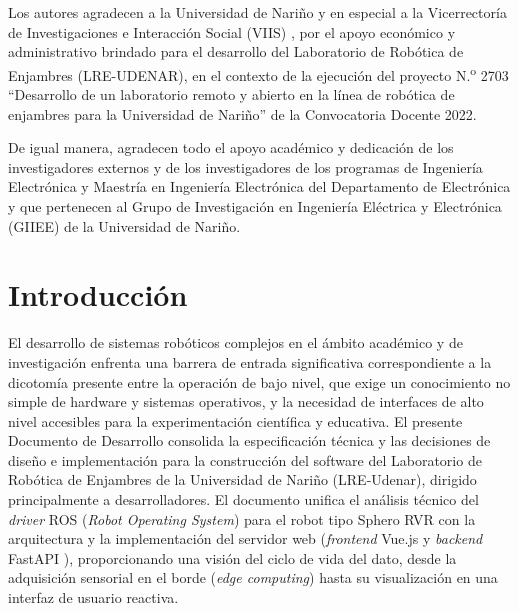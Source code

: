 \documentclass[12pt]{article}
\numberwithin{figure}{section}
\numberwithin{table}{section}
\begin{document}
Los autores agradecen a la Universidad de Nariño y en especial a la Vicerrectoría de Investigaciones e Interacción Social (VIIS) \cite{Udenar_VIIS_Web}, por el apoyo económico y administrativo brindado para el desarrollo del Laboratorio de Robótica de Enjambres (LRE-UDENAR), en el contexto de la ejecución del proyecto N.\textsuperscript{o} 2703 ``Desarrollo de un laboratorio remoto y abierto en la línea de robótica de enjambres para la Universidad de Nariño'' de la Convocatoria Docente 2022.

De igual manera, agradecen todo el apoyo académico y dedicación de los investigadores externos y de los investigadores de los programas de Ingeniería Electrónica y Maestría en Ingeniería Electrónica del Departamento de Electrónica y que pertenecen al Grupo de Investigación en Ingeniería Eléctrica y Electrónica (GIIEE) de la Universidad de Nariño.


\section{Introducción}
\justifying

El desarrollo de sistemas robóticos complejos en el ámbito académico y de investigación enfrenta una barrera de entrada significativa correspondiente a la dicotomía presente entre la operación de bajo nivel, que exige un conocimiento no simple de hardware y sistemas operativos, y la necesidad de interfaces de alto nivel accesibles para la experimentación científica y educativa. El presente Documento de Desarrollo consolida la especificación técnica y las decisiones de diseño e implementación para la construcción del software del Laboratorio de Robótica de Enjambres de la Universidad de Nariño (LRE-Udenar), dirigido principalmente a desarrolladores. El documento unifica el análisis técnico del \textit{driver} ROS (\textit{Robot Operating System}) \cite{ROSWebsite} para el robot tipo Sphero RVR \cite{Sphero_RVR_Plus} con la arquitectura y la implementación del servidor web (\textit{frontend} Vue.js \cite{VueJS_Website} y \textit{backend} FastAPI \cite{FastAPI_Docs}), proporcionando una visión del ciclo de vida del dato, desde la adquisición sensorial en el borde (\textit{edge computing}) \cite{Shi2016EdgeVision} hasta su visualización en una interfaz de usuario reactiva.
\end{document}
